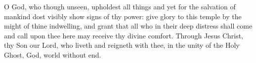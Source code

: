 O God, who though unseen, upholdest all things and yet for the salvation of mankind dost visibly show signs of thy power: give glory to this temple by the might of thine indwelling, and grant that all who in their deep distress shall come and call upon thee here may receive thy divine comfort. Through Jesus Christ, thy Son our Lord, who liveth and reigneth with thee, in the unity of the Holy Ghost, God, world without end.